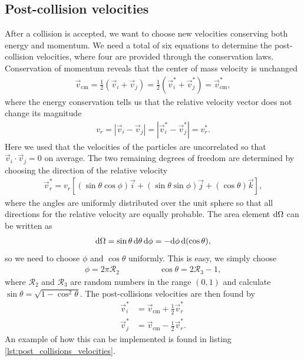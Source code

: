 \subsection{Post-collision velocities}
After a collision is accepted, we want to choose new velocities conserving both energy and momentum. We need a total of six equations to determine the post-collision velocities, where four are provided through the conservation laws. Conservation of momentum reveals that the center of mass velocity is unchanged
\begin{align}
	\vec v_\text{cm} = \frac{1}{2}(\vec v_i + \vec v_j) = \frac{1}{2}(\vec v_i^* + \vec v_j^*) = \vec v_\text{cm}^*,
\end{align}
where the energy conservation tells us that the relative velocity vector does not change its magnitude
\begin{align}
	v_r = |\vec v_i - \vec v_j| = |\vec v_i^* - \vec v_j^*| = v_r^*.
\end{align}
Here we used that the velocities of the particles are uncorrelated so that $\vec v_i\cdot\vec v_j = 0$ on average. The two remaining degrees of freedom are determined by choosing the direction of the relative velocity
\begin{align}
	\vec v_r^* = v_r\left[(\sin\theta\cos\phi)\vec i + (\sin\theta\sin\phi) \vec j + (\cos\theta)\vec k\right],
\end{align}
where the angles are uniformly distributed over the unit sphere so that all directions for the relative velocity are equally probable. The area element $\mathrm{d}\Omega$ can be written as
\begin{align}
	\mathrm{d}\Omega = \sin\theta\,\mathrm{d}\theta\,\mathrm{d}\phi = -\mathrm{d}\phi\,\mathrm{d}(\cos\theta),
\end{align}
so we need to choose $\phi$ and $\cos\theta$ uniformly. This is easy, we simply choose 
\begin{align*}
	\phi = 2\pi\mathcal{R}_2 & \qquad \qquad \cos\theta = 2\mathcal{R}_3 - 1,
\end{align*}
where $\mathcal{R}_2$ and $\mathcal{R}_3$ are random numbers in the range $(0,1)$ and calculate $\sin\theta = \sqrt{1 - \cos^2\theta}$. The post-collisions velocities are then found by
\begin{align}
	\vec v_i^* &= \vec v_\text{cm} + \frac{1}{2}\vec v_r^*\\
	\vec v_j^* &= \vec v_\text{cm} - \frac{1}{2}\vec v_r^*.
\end{align}
An example of how this can be implemented is found in listing \ref{lst:post_collisions_velocities}.
